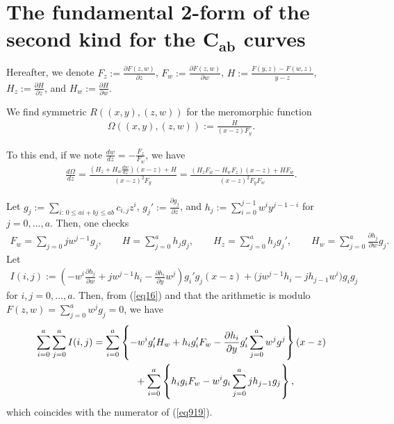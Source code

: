 \documentclass[pdftex]{sigma}
\numberwithin{equation}{section}
\theoremstyle{definition}
\begin{document}
\section[The fundamental 2-form of the second kind for the $C_{ab}$ curves]{The fundamental 2-form of the second kind for the $\boldsymbol{C_{ab}}$ curves}\label{section3}

Hereafter, we denote $ F_z:=\frac{\partial F(z,w)}{\partial z}$, $ F_w:=\frac{\partial F(z,w)}{\partial w}$, $ H:=\frac{F(y,z)-F(w,z)}{y-z}$, $ H_z:=\frac{\partial H}{\partial z}$, and $ H_w:=\frac{\partial H}{\partial w}$.

We f\/ind symmetric $R((x,y),(z,w))$ for the meromorphic function
\begin{gather*}\Omega((x,y),(z,w)):=\frac{H}{(x-z)F_y}.\end{gather*}

To this end, if we note $ \frac{dw}{dz}=-\frac{F_z}{F_w}$, we have
\begin{gather}\label{eq919}
\frac{d\Omega}{dz}=\frac{(H_z+H_w\frac{dw}{dz})(x-z)+H}{(x-z)^2F_y}=\frac{(H_zF_w-H_wF_z)(x-z)+HF_w}{(x-z)^2F_yF_w}.
\end{gather}

Let $ g_j:=\sum\limits_{i\colon \, 0\leq ai+bj\leq ab}c_{i,j}z^i$, $ g_j':=\frac{\partial g_j}{\partial z}$, and $ h_j:=\sum\limits_{i=0}^{j-1}w^iy^{j-1-i}$ for $j=0,\dots,a$. Then, one checks
\begin{gather}\label{eq16}
F_w=\sum_{j=0}jw^{j-1}g_j,\qquad H=\sum_{j=0}^a h_jg_j,\qquad H_z=\sum_{j=0}^a h_jg_j',\qquad H_w=\sum_{j=0}^a \frac{\partial h_j}{\partial w}g_j.
\end{gather}
Let
\begin{gather*}I(i,j):=\left(-w^i\frac{\partial h_j}{\partial w}+jw^{j-1}h_i- \frac{\partial {h}_{i}}{\partial y}w^j\right)g_i'g_j(x-z)+\big(jw^{j-1}h_i-jh_{j-1}w^i\big)g_ig_j\end{gather*}
for $i,j=0,\dots,a$. Then, from (\ref{eq16}) and that the arithmetic is modulo $F(z,w)=\sum\limits_{j=0}^a w^jg_j=0$, we have
\begin{gather*}\sum_{i=0}^a\sum_{j=0}^a I(i,j)=\sum_{i=0}^a\left\{-w^ig_i'H_w+h_ig_i'F_w-\frac{\partial h_i}{\partial y}g_i'\sum_{j=0}^a w^jg^j\right\}(x-z)\\
\hphantom{\sum_{i=0}^a\sum_{j=0}^a I(i,j)=}{} +
\sum_{i=0}^a\left\{h_ig_iF_w-w^ig_i\sum_{j=0}^ajh_{j-1}g_j\right\},\end{gather*}
which coincides with the numerator of (\ref{eq919}).
\end{document}
